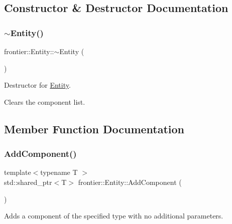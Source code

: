 \subsection{Constructor \& Destructor Documentation}
\mbox{\label{classfrontier_1_1_entity_a56e4bc3a132b605bd8432259d8209808}} 
\subsubsection{\texorpdfstring{$\sim$\+Entity()}{~Entity()}}
{\footnotesize\ttfamily frontier\+::\+Entity\+::$\sim$\+Entity (\begin{DoxyParamCaption}{ }\end{DoxyParamCaption})}



Destructor for \hyperlink{classfrontier_1_1_entity}{Entity}. 

Clears the component list. 

\subsection{Member Function Documentation}
\mbox{\label{classfrontier_1_1_entity_a5e19d6aee12b8d96605887e5576e6eb0}} 
\subsubsection{\texorpdfstring{Add\+Component()}{AddComponent()}\hspace{0.1cm}{\footnotesize\ttfamily [1/5]}}
{\footnotesize\ttfamily template$<$typename T $>$ \\
std\+::shared\+\_\+ptr$<$T$>$ frontier\+::\+Entity\+::\+Add\+Component (\begin{DoxyParamCaption}{ }\end{DoxyParamCaption})\hspace{0.3cm}{\ttfamily [inline]}}



Adds a component of the specified type with no additional parameters. 

\mbox{\label{classfrontier_1_1_entity_ac554988ee6313f4ef9d5e777825d82a0}} 

